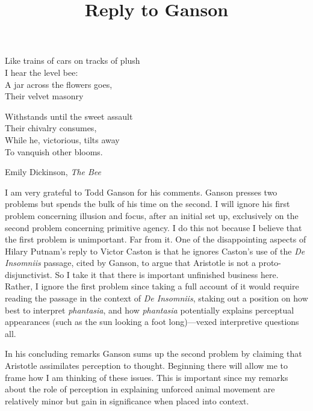 \documentclass[12pt]{article}
\title{Reply to Ganson}
\author{\myauthor}
\date{} %
\begin{document}
\maketitle
\epigraph{Like trains of cars on tracks of plush \\
I hear the level bee: \\
A jar across the flowers goes, \\
Their velvet masonry \\

\hfill \break

Withstands until the sweet assault \\
Their chivalry consumes, \\
While he, victorious, tilts away \\
To vanquish other blooms.}{Emily Dickinson, \emph{The Bee}} %

\setlength{\parindent}{1em}


I am very grateful to Todd Ganson for his comments. Ganson presses two problems but spends the bulk of his time on the second. I will ignore his first problem concerning illusion and focus, after an initial set up, exclusively on the second problem concerning primitive agency. I do this not because I believe that the first problem is unimportant. Far from it. One of the disappointing aspects of Hilary Putnam's \citeyearpar{Putnam:2012eu} reply to Victor Caston \citeyearpar{Caston:1998nx} is that he ignores Caston's use of the \emph{De Insomniis} passage, cited by Ganson, to argue that Aristotle is not a proto-disjunctivist. So I take it that there is important unfinished business here. Rather, I ignore the first problem since taking a full account of it would require reading the passage in the context of \emph{De Insomniis}, staking out a position on how best to interpret \emph{phantasia}, and how \emph{phantasia} potentially explains perceptual appearances (such as the sun looking a foot long)---vexed interpretive questions all. 

In his concluding remarks Ganson sums up the second problem by claiming that Aristotle assimilates perception to thought. Beginning there will allow me to frame how I am thinking of these issues. This is important since my remarks about the role of perception in explaining unforced animal movement are relatively minor but gain in significance when placed into context.
\end{document}
